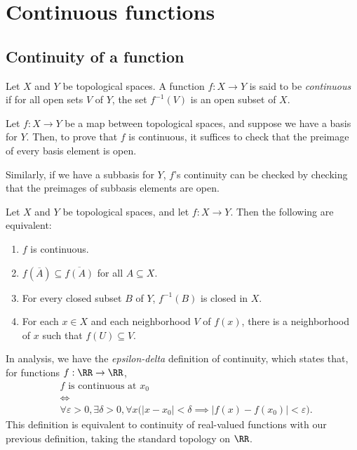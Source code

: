 \documentclass{article}
\begin{document}

\section{Continuous functions}

\subsection{Continuity of a function}

\begin{definition}
    Let $X$ and $Y$ be topological spaces.
    A function $f: X \to Y$ is said to be \textit{continuous} if for all open sets $V$ of $Y$, the set $f^{-1}(V)$ is an open subset of $X$.
\end{definition}

\begin{proposition}
    Let $f: X \to Y$ be a map between topological spaces, and suppose we have a basis for $Y$.
    Then, to prove that $f$ is continuous, it suffices to check that the preimage of every basis element is open.

    Similarly, if we have a subbasis for $Y$, $f$'s continuity can be checked by checking that the preimages of subbasis elements are open.
\end{proposition}

\begin{theorem}
    Let $X$ and $Y$ be topological spaces, and let $f:X \to Y$.
    Then the following are equivalent:
    \begin{enumerate}[label=(\alph*)]
        \item $f$ is continuous.
        \item $f(\overline{A}) \subseteq \overline{f(A)}$ for all $A \subseteq X$.
        \item For every closed subset $B$ of $Y$, $f^{-1}(B)$ is closed in $X$.
        \item For each $x \in X$ and each neighborhood $V$ of $f(x)$, there is a neighborhood of $x$ such that $f(U) \subseteq V$.
    \end{enumerate}
\end{theorem}

\begin{example}
    In analysis, we have the \textit{epsilon-delta} definition of continuity, which states that, for functions $f: \RR \to \RR$,
    \begin{align*}
        &f\text{ is continuous at }x_0 \\
        &\iff \\
        &\forall \varepsilon > 0, \exists \delta > 0, \forall x \Big(|x - x_0| < \delta \implies |f(x) - f(x_0)| < \varepsilon\Big).
    \end{align*}
    This definition is equivalent to continuity of real-valued functions with our previous definition, taking the standard topology on $\RR$.
\end{example}
\end{document}

